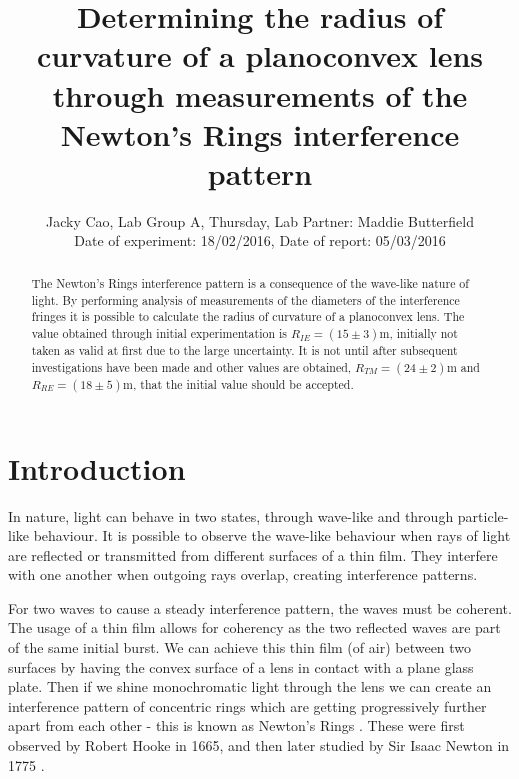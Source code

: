 \documentclass[twocolumn]{revtex4}
\begin{document}
\textheight=26.385cm

\title{Determining the radius of curvature of a planoconvex lens through measurements of the Newton's Rings interference pattern} 
 
 
\author{Jacky Cao, Lab Group A, Thursday, Lab Partner: Maddie Butterfield\\ Date of experiment: 18/02/2016, Date of report: 05/03/2016}


\begin{abstract}              
 
The Newton's Rings interference pattern is a consequence of the wave-like nature of light. By performing analysis of measurements of the diameters of the interference fringes it is possible to calculate the radius of curvature of a planoconvex lens. The value obtained through initial experimentation is $R_{IE}=(15\pm3)$m, initially not taken as valid at first due to the large uncertainty. It is not until after subsequent investigations have been made and other values are obtained, $R_{TM}=(24\pm2)$m and $R_{RE}=(18\pm5)$m, that the initial value should be accepted. 

\end{abstract}

\maketitle

\section{Introduction} 
\vspace{-2ex} 
In nature, light can behave in two states, through wave-like and through particle-like behaviour. It is possible to observe the wave-like behaviour when rays of light are reflected or transmitted from different surfaces of a thin film. They interfere with one another when outgoing rays overlap, creating interference patterns. 

For two waves to cause a steady interference pattern, the waves must be coherent. The usage of a thin film allows for coherency as the two reflected waves are part of the same initial burst. We can achieve this thin film (of air) between two surfaces by having the convex surface of a lens in contact with a plane glass plate. Then if we shine monochromatic light through the lens we can create an interference pattern of concentric rings which are getting progressively further apart from each other - this is known as Newton's Rings \cite{lens}. These were first observed by Robert Hooke in 1665, and then later studied by Sir Isaac Newton in 1775 \cite{labscript}.
\end{document}
